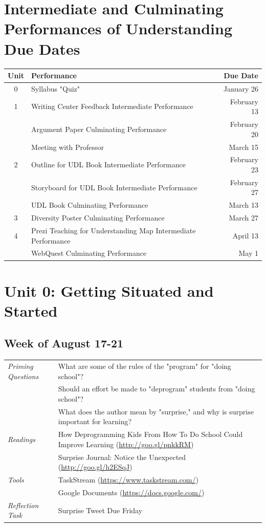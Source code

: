 \documentclass{tufte-handout}
\newcommand{\tabpq}{\faQuestionSign\medspace\textit{Priming Questions}}
\newcommand{\tabread}{\faBook\medspace\textit{Readings}}
\newcommand{\tabtools}{\faWrench\medspace\textit{Tools}}
\newcommand{\tabtweet}{\faLightbulb\medspace\textit{Reflection Task} & Surprise Tweet Due Friday \\}
\newenvironment{tabsched}
	{\small
	\begin{tabular}{p{1.5in}p{5in}}
	\toprule}
	{\bottomrule
	\end{tabular}
	\normalsize}
\newcommand{\weekone}{August 17-21}
\begin{document}
\medskip

\section{Intermediate and Culminating Performances of Understanding Due Dates}
\begin{tabular}{clr}
	\toprule
	Unit & Performance & Due Date \\
	\midrule\midrule
	0 & Syllabus "Quiz" & January 26 \\
	\midrule
	1 & Writing Center Feedback Intermediate Performance & February 13 \\
	& Argument Paper Culminating Performance & February 20 \\
	& Meeting with Professor & March 15 \\
	\midrule
	2 & Outline for UDL Book Intermediate Performance & February 23 \\
	& Storyboard for UDL Book Intermediate Performance & February 27 \\
	& UDL Book Culminating Performance & March 13 \\
	\midrule
	3 & Diversity Poster Culminating Performance & March 27 \\
	\midrule
	4 & Prezi Teaching for Understanding Map Intermediate Performance  & April 13 \\
	& WebQuest Culminating Performance & May 1 \\
	\bottomrule
\end{tabular}


\section{Unit 0: Getting Situated and Started}

\subsection{Week of \weekone}

\begin{tabsched}
	\tabpq & What are some of the rules of the "program" for "doing school"? \\
	& Should an effort be made to "deprogram" students from "doing school"? \\
	& What does the author mean by "surprise," and why is surprise important for learning? \\
	\midrule
	\tabread & How Deprogramming Kids From How To Do School Could Improve Learning (\url{http://goo.gl/pnkkRM}) \\
	& Surprise Journal: Notice the Unexpected (\url{http://goo.gl/h2ESqJ}) \\
	\midrule
	\tabtools & TaskStream (\url{https://www.taskstream.com/}) \\
	& Google Documents (\url{https://docs.google.com/}) \\
	\midrule
	\tabtweet
\end{tabsched}
\end{document}
